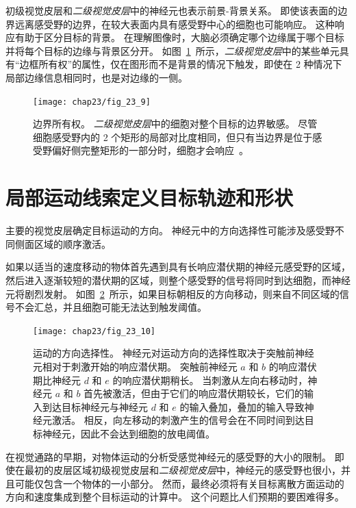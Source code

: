 初级视觉皮层和\textit{二级视觉皮层}中的神经元也表示前景-背景关系。
即使该表面的边界远离感受野的边界，在较大表面内具有感受野中心的细胞也可能响应。
这种响应有助于区分目标的背景。
在理解图像时，大脑必须确定哪个边缘属于哪个目标并将每个目标的边缘与背景区分开。
如图~\ref{fig:23_9}~所示，\textit{二级视觉皮层}中的某些单元具有“边框所有权”的属性，仅在图形而不是背景的情况下触发，即使在 2 种情况下局部边缘信息相同时，也是对边缘的一侧。


\begin{figure}[htbp]
	\centering
	\texttt{[image: chap23/fig\_23\_9]}
	\caption{边界所有权。
		\textit{二级视觉皮层}中的细胞对整个目标的边界敏感。
		尽管细胞感受野内的 2 个矩形的局部对比度相同，但只有当边界是位于感受野偏好侧完整矩形的一部分时，细胞才会响应~\cite{zhou2000coding}。}
	\label{fig:23_9}
\end{figure}



\section{局部运动线索定义目标轨迹和形状}

主要的视觉皮层确定目标运动的方向。
神经元中的方向选择性可能涉及感受野不同侧面区域的顺序激活。


如果以适当的速度移动的物体首先遇到具有长响应潜伏期的神经元感受野的区域，然后进入逐渐较短的潜伏期的区域，则整个感受野的信号将同时到达细胞，而神经元将剧烈发射。
如图~\ref{fig:23_10}~所示，如果目标朝相反的方向移动，则来自不同区域的信号不会汇总，并且细胞可能无法达到触发阈值。


\begin{figure}[htbp]
	\centering
	\texttt{[image: chap23/fig\_23\_10]}
	\caption{运动的方向选择性。
		神经元对运动方向的选择性取决于突触前神经元相对于刺激开始的响应潜伏期。
		突触前神经元 $a$ 和 $b$ 的响应潜伏期比神经元 $d$ 和 $e$ 的响应潜伏期稍长。
		当刺激从左向右移动时，神经元 $a$ 和 $b$ 首先被激活，但由于它们的响应潜伏期较长，它们的输入到达目标神经元与神经元 $d$ 和 $e$ 的输入叠加，叠加的输入导致神经元激活。
		相反，向左移动的刺激产生的信号会在不同时间到达目标神经元，因此不会达到细胞的放电阈值\cite{priebe2008inhibition}。}
	\label{fig:23_10}
\end{figure}


在视觉通路的早期，对物体运动的分析受感觉神经元的感受野的大小的限制。 
即使在最初的皮层区域初级视觉皮层和\textit{二级视觉皮层}中，神经元的感受野也很小，并且可能仅包含一个物体的一小部分。
然而，最终必须将有关目标离散方面运动的方向和速度集成到整个目标运动的计算中。 
这个问题比人们预期的要困难得多。


